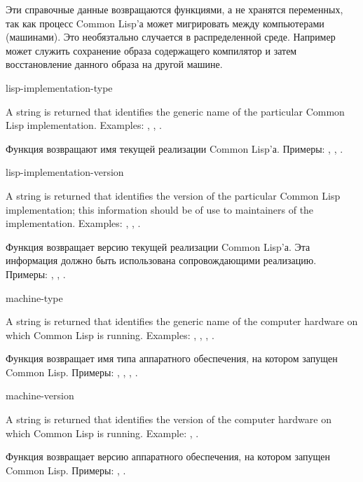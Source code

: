 \beforenoterule
\begin{rationale}
Эти справочные данные возвращаются функциями, а не хранятся переменных, так как
процесс Common Lisp'а может мигрировать между компьютерами (машинами).
Это необязтально случается в распределенной среде.
Например может служить сохранение образа содержащего компилятор и затем
восстановление данного образа на другой машине. 
\end{rationale}
\afternoterule

\begin{defun}[Function]
lisp-implementation-type 

A string is returned that identifies the generic name of
the particular Common Lisp implementation.
Examples: , , .

Функция возвращают имя текущей реализации Common Lisp'а.
Примеры: , , .
\end{defun}

\begin{defun}[Function]
lisp-implementation-version 

A string is returned that identifies the version of
the particular Common Lisp implementation; this information
should be of use to maintainers of the implementation.
Examples: , ,
.

Функция возвращает версию текущей реализации Common Lisp'а.
Эта информация должно быть использована сопровождающими реализацию.
Примеры: , ,
.
\end{defun}

\begin{defun}[Function]
machine-type 

A string is returned that identifies the generic name of
the computer hardware on which Common Lisp is running.
Examples: , , , .

Функция возвращает имя типа аппаратного обеспечения, на котором запущен Common
Lisp.
Примеры: , , , .
\end{defun}

\begin{defun}[Function]
machine-version 

A string is returned that identifies the version of
the computer hardware on which Common Lisp is running.
Example: , .

Функция возвращает версию аппаратного обеспечения, на котором запущен Common
Lisp.
Примеры: , .
\end{defun}


